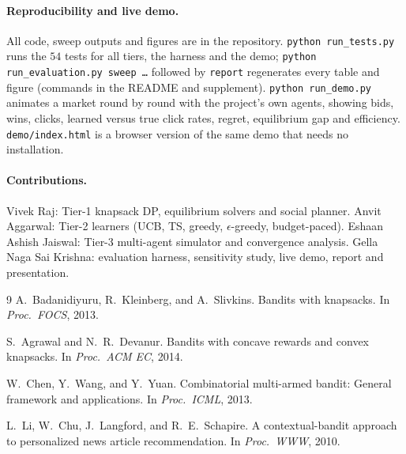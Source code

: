 \documentclass[11pt]{article}
\begin{document}
\paragraph{Reproducibility and live demo.}\label{sec:repro} All code, sweep outputs and figures are
in the repository. \texttt{python run\_tests.py} runs the $54$ tests for all tiers, the harness and the demo;
\texttt{python run\_evaluation.py sweep \dots} followed by \texttt{report} regenerates every table and
figure (commands in the README and supplement). \texttt{python run\_demo.py} animates a market round by
round with the project's own agents, showing bids, wins, clicks, learned versus true click rates, regret,
equilibrium gap and efficiency. \texttt{demo/index.html} is a browser version of the same demo that
needs no installation.

\paragraph{Contributions.} Vivek Raj: Tier-1 knapsack DP, equilibrium solvers and social planner.
Anvit Aggarwal: Tier-2 learners (UCB, TS, greedy, $\epsilon$-greedy, budget-paced). Eshaan Ashish
Jaiswal: Tier-3 multi-agent simulator and convergence analysis. Gella Naga Sai Krishna: evaluation
harness, sensitivity study, live demo, report and presentation.

\small
\begin{thebibliography}{9}
A.~Badanidiyuru, R.~Kleinberg, and A.~Slivkins.
\newblock Bandits with knapsacks.
\newblock In \emph{Proc.\ FOCS}, 2013.

S.~Agrawal and N.~R.~Devanur.
\newblock Bandits with concave rewards and convex knapsacks.
\newblock In \emph{Proc.\ ACM EC}, 2014.

W.~Chen, Y.~Wang, and Y.~Yuan.
\newblock Combinatorial multi-armed bandit: General framework and applications.
\newblock In \emph{Proc.\ ICML}, 2013.

L.~Li, W.~Chu, J.~Langford, and R.~E.~Schapire.
\newblock A contextual-bandit approach to personalized news article recommendation.
\newblock In \emph{Proc.\ WWW}, 2010.
\end{thebibliography}
\end{document}
